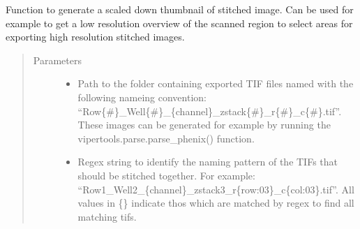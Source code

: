 \documentclass[a4paper,10pt,english,openany,oneside]{sphinxmanual}
\begin{document}
\begin{fulllineitems}
\label{\detokenize{pages/modules:vipertools.stitch.generate_stitched}}
\sphinxAtStartPar
Function to generate a scaled down thumbnail of stitched image. Can be used for example to
get a low resolution overview of the scanned region to select areas for exporting high resolution
stitched images.
\begin{quote}\begin{description}
\item[{Parameters}] \leavevmode\begin{itemize}
\item {} 
\sphinxAtStartPar
{} \textendash{} Path to the folder containing exported TIF files named with the following nameing convention: “Row\{\#\}\_Well\{\#\}\_\{channel\}\_zstack\{\#\}\_r\{\#\}\_c\{\#\}.tif”.
These images can be generated for example by running the vipertools.parse.parse\_phenix() function.

\item {} 
\sphinxAtStartPar
{} \textendash{} Regex string to identify the naming pattern of the TIFs that should be stitched together.
For example: “Row1\_Well2\_\{channel\}\_zstack3\_r\{row:03\}\_c\{col:03\}.tif”.
All values in \{\} indicate thos which are matched by regex to find all matching tifs.


\end{itemize}
\end{description}
\end{quote}
\end{fulllineitems}
\end{document}
